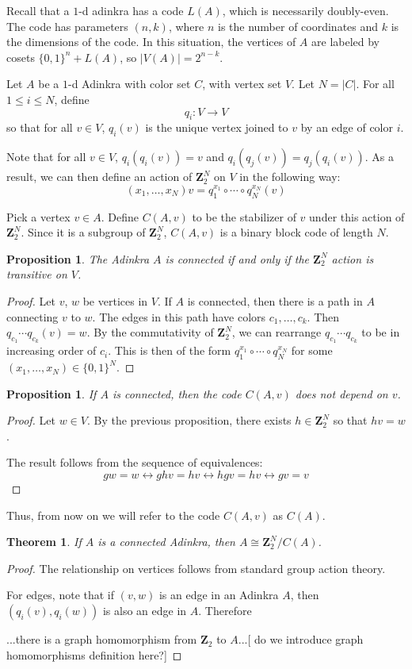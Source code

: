 \documentclass[12pt,twoside,singlespace]{article}
\numberwithin{equation}{section}
\newtheorem{thm}[equation]{Theorem}
\newtheorem{prop}[equation]{Proposition}
\theoremstyle{definition}
\newcommand{\ZZ}{\mathbf{Z}}
\begin{document}
Recall that a $1$-d adinkra has a code $L(A)$, which is necessarily doubly-even. The code has parameters $(n,k)$, where $n$ is the number of coordinates and $k$ is the dimensions of the code. In this situation, the vertices of $A$ are labeled by cosets $\{0,1\}^n + L(A)$, so $|V(A)| = 2^{n-k}$.


Let $A$ be a $1$-d Adinkra with color set $C$, with vertex set $V$.  Let $N=|C|$.  For all $1\le i\le N$, define
\[q_i:V\to V\]
so that for all $v\in V$, $q_i(v)$ is the unique vertex joined to $v$ by an edge of color $i$.

Note that for all $v\in V$, $q_i(q_i(v))=v$ and $q_i(q_j(v))=q_j(q_i(v))$.  As a result, we can then define an action of $\ZZ_2^N$ on $V$ in the following way:
\[(x_1,\ldots,x_N)v=q_1^{x_1}\circ\cdots\circ q_N^{x_N}(v)\]

Pick a vertex $v\in A$.  Define $C(A,v)$ to be the stabilizer of $v$ under this action of $\ZZ_2^N$.  Since it is a subgroup of $\ZZ_2^N$, $C(A,v)$ is a binary block code of length $N$.

\begin{prop}
The Adinkra $A$ is connected if and only if the $\ZZ_2^N$ action is transitive on $V$.
\end{prop}
\begin{proof}
Let $v$, $w$ be vertices in $V$.  If $A$ is connected, then there is a path in $A$ connecting $v$ to $w$.  The edges in this path have colors $c_1,\ldots,c_k$.  Then $q_{c_1}\cdots q_{c_k}(v)=w$.  By the commutativity of $\ZZ_2^N$, we can rearrange $q_{c_1}\cdots q_{c_k}$ to be in increasing order of $c_i$.  This is then of the form $q_1^{x_1}\circ \cdots \circ q_N^{x_N}$ for some $(x_1,\ldots,x_N)\in \{0,1\}^N$.
\end{proof}

\begin{prop}
If $A$ is connected, then the code $C(A,v)$ does not depend on $v$.
\end{prop}
\begin{proof}
Let $w\in V$.  By the previous proposition, there exists $h\in \ZZ_2^N$ so that $hv=w$.

The result follows from the sequence of equivalences:
\[gw=w\leftrightarrow ghv=hv \leftrightarrow hgv=hv \leftrightarrow gv=v\]
\end{proof}
Thus, from now on we will refer to the code $C(A,v)$ as $C(A)$.


\begin{thm}
If $A$ is a connected Adinkra, then $A\cong \ZZ_2^N/C(A)$.
\end{thm}
\begin{proof}
The relationship on vertices follows from standard group action theory.

For edges, note that if $(v,w)$ is an edge in an Adinkra $A$, then $(q_i(v),q_i(w))$ is also an edge in $A$.  Therefore 

...there is a graph homomorphism from $\ZZ_2$ to $A$...[ do we introduce graph homomorphisms definition here?]
\end{proof}
\end{document}
